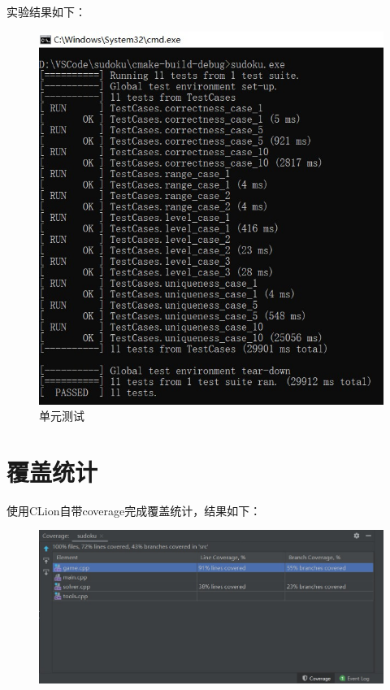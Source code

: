 \documentclass[a4paper]{article}
\begin{document}
实验结果如下：

\begin{figure}[H]
  \centering
  \includegraphics[scale=0.9]{images/test.jpg}
  \caption{单元测试}
  \label{fig:test}
\end{figure}
\section{覆盖统计}
使用CLion自带coverage完成覆盖统计，结果如下：

\begin{figure}[H]
  \centering
  \includegraphics[scale=0.75]{images/cov_1.jpg}
  \label{fig:cov_1}
\end{figure}
\end{document}
